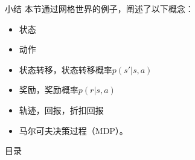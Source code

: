 \begin{frame}{小结}
    本节通过网格世界的例子，阐述了以下概念：
    \begin{itemize}
        \item 状态
        \item 动作
        \item 状态转移，状态转移概率$p(s'|s, a)$
        \item 奖励，奖励概率$p(r|s,a)$
        \item 轨迹，回报，折扣回报
        \item 马尔可夫决策过程（MDP）。
    \end{itemize}
\end{frame}

\begin{frame}{目录}
    \tableofcontents
\end{frame}
